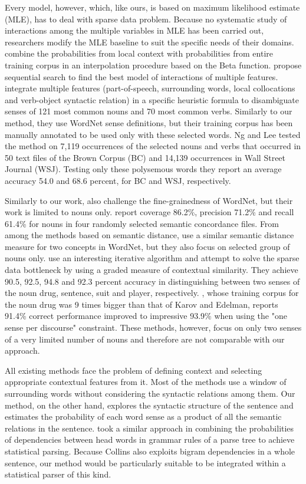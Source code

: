 Every model, however, which, like ours, is based on maximum likelihood estimate (MLE), has to deal with sparse data problem. Because no systematic study of interactions among the multiple variables in MLE has been carried out, researchers modify the MLE baseline to suit the specific needs of their domains. \cite{Gale93} combine the probabilities from local context with probabilities from entire training corpus in an interpolation procedure based on the Beta function. \cite{Bruce97} propose sequential search to find the best model of interactions of multiple features. \cite{NL96} integrate multiple features (part-of-speech, surrounding words, local collocations and verb-object syntactic relation) in a specific heuristic formula to disambiguate senses of 121 most common nouns and 70 most common verbs. Similarly to our method, they use WordNet sense definitions, but their training corpus has been manually annotated to be used only with these selected words. Ng and Lee tested the method on 7,119 occurrences of the selected nouns and verbs that occurred in 50 text files of the Brown Corpus (BC) and 14,139 occurrences in Wall Street Journal (WSJ). Testing only these polysemous words they report an average accuracy 54.0 and 68.6 percent, for BC and WSJ, respectively. 

Similarly to our work, also \cite{Resnik95}\cite{AR96} challenge the fine-grainedness of WordNet, but their work is limited to nouns only. \cite{AR96} report coverage 86.2\%, precision 71.2\% and recall 61.4\% for nouns in four randomly selected semantic concordance files. From among the methods based on semantic distance, \cite{Resnik93}\cite{Sussna93} use a similar semantic distance measure for two concepts in WordNet, but they also focus on selected group of nouns only. \cite{KE96} use an interesting iterative algorithm and attempt to solve the sparse data bottleneck by using a graded measure of contextual similarity. They achieve 90.5, 92.5, 94.8 and 92.3 percent accuracy in distinguishing between two senses of the noun drug, sentence, suit and player, respectively. \cite{Yarowsky95}, whose training corpus for the noun drug was 9 times bigger than that of Karov and Edelman, reports 91.4\% correct performance improved to impressive 93.9\% when using the "one sense per discourse" constraint. These methods, however, focus on only two senses of a very limited number of nouns and therefore are not comparable with our approach. 

All existing methods face the problem of defining context and selecting appropriate contextual features from it. Most of the methods use a window of surrounding words without considering the syntactic relations among them. Our method, on the other hand, explores the syntactic structure of the sentence and estimates the probability of each word sense as a product of all the semantic relations in the sentence. \cite{Collins96} took a similar approach in combining the probabilities of dependencies between head words in grammar rules of a parse tree to achieve statistical parsing. Because Collins also exploits bigram dependencies in a whole sentence, our method would be particularly suitable to be integrated within a statistical parser of this kind.

